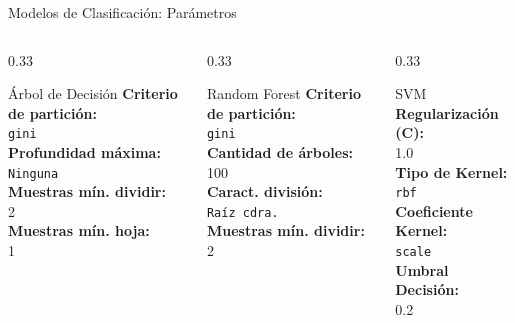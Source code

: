 \documentclass[10pt]{beamer}
\begin{document}
\begin{frame}{Modelos de Clasificación: Parámetros}
  \begin{columns}[T]
    
    \begin{column}{0.33\textwidth}
      \begin{block}{Árbol de Decisión}
        \vspace{0.1cm}
        \scriptsize
        \textbf{Criterio de partición:}\\ \texttt{gini} \\[1.5ex]
        \textbf{Profundidad máxima:}\\ \texttt{Ninguna} \\[1.5ex]
        \textbf{Muestras mín. dividir:}\\ 2 \\[1.5ex]
        \textbf{Muestras mín. hoja:}\\ 1
        \vspace{0.1cm}
      \end{block}
    \end{column}

    \begin{column}{0.33\textwidth}
      \begin{exampleblock}{Random Forest}
        \vspace{0.1cm}
        \scriptsize
        \textbf{Criterio de partición:}\\ \texttt{gini} \\[1.5ex]
        \textbf{Cantidad de árboles:}\\ 100 \\[1.5ex]
        \textbf{Caract. división:}\\ \texttt{Raíz cdra.} \\[1.5ex]
        \textbf{Muestras mín. dividir:}\\ 2
        \vspace{0.1cm}
      \end{exampleblock}
    \end{column}

    \begin{column}{0.33\textwidth}
      \begin{alertblock}{SVM}
        \vspace{0.1cm}
        \scriptsize
        \textbf{Regularización (C):}\\ 1.0 \\[1.5ex]
        \textbf{Tipo de Kernel:}\\ \texttt{rbf} \\[1.5ex]
        \textbf{Coeficiente Kernel:}\\ \texttt{scale} \\[1.5ex]
        \textbf{Umbral Decisión:}\\ 0.2
        \vspace{0.1cm}
      \end{alertblock}
    \end{column}


\end{columns}
\end{frame}
\end{document}
